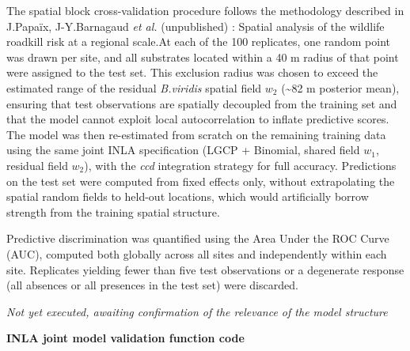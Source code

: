 \documentclass[
  letterpaper,
  DIV=11,
  numbers=noendperiod]{scrartcl}
\begin{document}
The spatial block cross-validation procedure follows the methodology
described in J.Papaïx, J-Y.Barnagaud \emph{et al.} (unpublished) :
Spatial analysis of the wildlife roadkill risk at a regional scale.At
each of the 100 replicates, one random point was drawn per site, and all
substrates located within a 40 m radius of that point were assigned to
the test set. This exclusion radius was chosen to exceed the estimated
range of the residual \emph{B.viridis} spatial field \(w_2\)
(\textasciitilde82 m posterior mean), ensuring that test observations
are spatially decoupled from the training set and that the model cannot
exploit local autocorrelation to inflate predictive scores. The model
was then re-estimated from scratch on the remaining training data using
the same joint INLA specification (LGCP + Binomial, shared field
\(w_1\), residual field \(w_2\)), with the \emph{ccd} integration
strategy for full accuracy. Predictions on the test set were computed
from fixed effects only, without extrapolating the spatial random fields
to held-out locations, which would artificially borrow strength from the
training spatial structure.

Predictive discrimination was quantified using the Area Under the ROC
Curve (AUC), computed both globally across all sites and independently
within each site. Replicates yielding fewer than five test observations
or a degenerate response (all absences or all presences in the test set)
were discarded.

\begin{tcolorbox}[enhanced jigsaw, breakable, colback=white, opacityback=0, bottomtitle=1mm, arc=.35mm, rightrule=.15mm, colbacktitle=quarto-callout-note-color!10!white, titlerule=0mm, colframe=quarto-callout-note-color-frame, toprule=.15mm, opacitybacktitle=0.6, coltitle=black, left=2mm, bottomrule=.15mm, leftrule=.75mm, toptitle=1mm, title=\textcolor{quarto-callout-note-color}{\faInfo}\hspace{0.5em}{NB}]

\emph{Not yet executed, awaiting confirmation of the relevance of the
model structure}

\end{tcolorbox}

\textbf{INLA joint model validation function code}
\end{document}
